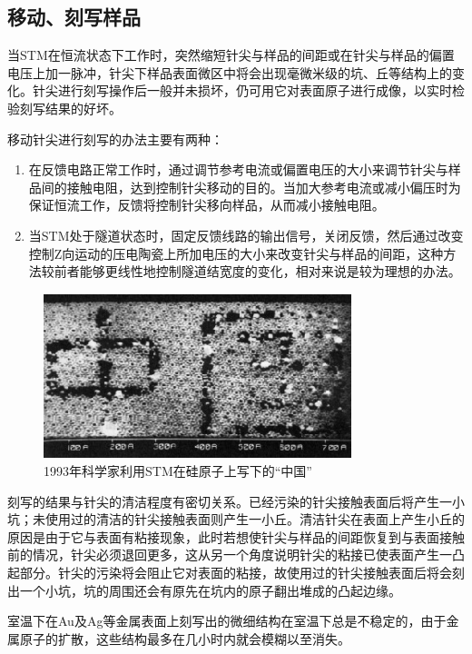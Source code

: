\documentclass[a4paper, zihao=-4, linespread=1.25]{ctexrep}
\begin{document}
\subsection{移动、刻写样品}
当STM在恒流状态下工作时，突然缩短针尖与样品的间距或在针尖与样品的偏置电压上加一脉冲，针尖下样品表面微区中将会出现毫微米级的坑、丘等结构上的变化。针尖进行刻写操作后一般并未损坏，仍可用它对表面原子进行成像，以实时检验刻写结果的好坏。

移动针尖进行刻写的办法主要有两种：
\begin{enumerate}
	\item 在反馈电路正常工作时，通过调节参考电流或偏置电压的大小来调节针尖与样品间的接触电阻，达到控制针尖移动的目的。当加大参考电流或减小偏压时为保证恒流工作，反馈将控制针尖移向样品，从而减小接触电阻。
	\item 当STM处于隧道状态时，固定反馈线路的输出信号，关闭反馈，然后通过改变控制Z向运动的压电陶瓷上所加电压的大小来改变针尖与样品的间距，这种方法较前者能够更线性地控制隧道结宽度的变化，相对来说是较为理想的办法。
\end{enumerate}

\begin{figure}
	\centering
	\includegraphics[width=0.8\textwidth]{figures/stm}
	\caption[ZhongGuo]{1993年科学家利用STM在硅原子上写下的“中国”}
	\label{fig:ZhongGuo}
\end{figure}

刻写的结果与针尖的清洁程度有密切关系。已经污染的针尖接触表面后将产生一小坑；未使用过的清洁的针尖接触表面则产生一小丘。清洁针尖在表面上产生小丘的原因是由于它与表面有粘接现象，此时若想使针尖与样品的间距恢复到与表面接触前的情况，针尖必须退回更多，这从另一个角度说明针尖的粘接已使表面产生一凸起部分。针尖的污染将会阻止它对表面的粘接，故使用过的针尖接触表面后将会刻出一个小坑，坑的周围还会有原先在坑内的原子翻出堆成的凸起边缘。

室温下在Au及Ag等金属表面上刻写出的微细结构在室温下总是不稳定的，由于金属原子的扩散，这些结构最多在几小时内就会模糊以至消失。
\end{document}
